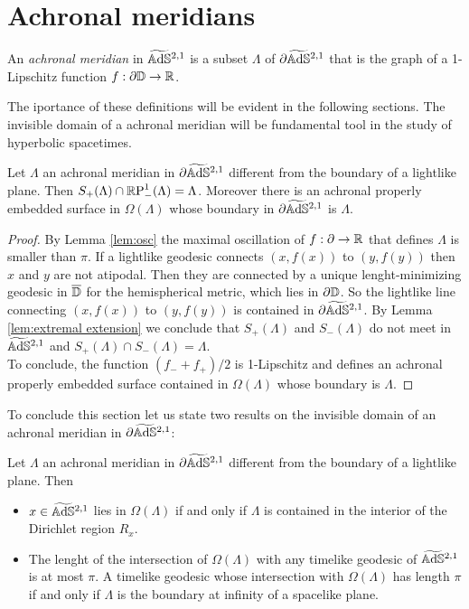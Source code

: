 \section{Achronal meridians}
\begin{definition}
    An \textit{achronal meridian} in $\AS^{2,1}$ is a subset $\Lambda$ of $\partial\AS^{2,1}$ that is the graph of a 1-Lipschitz function $f: \partial\D\to\R$.
\end{definition}
The iportance of these definitions will be evident in the following sections.
The invisible domain of a achronal meridian will be fundamental tool in the study of hyperbolic spacetimes.
\begin{lemma}
    Let $\Lambda$ an achronal meridian in $\partial\AS^{2,1}$ different from the boundary of a lightlike plane. Then $S_+(\Lambda) \cap \S_-(\Lambda)=\Lambda$. Moreover there is an achronal properly embedded surface in $\Omega(\Lambda)$ whose boundary in $\partial\AS^{2,1}$ is $\Lambda$.
\end{lemma}
\begin{proof}
    By Lemma \ref{lem:osc} the maximal oscillation of $f:\partial \to \R$ that defines $\Lambda$ is smaller than $\pi$. If a lightlike geodesic connects $(x,f(x))$ to $(y,f(y))$ then $x$ and $y$ are not atipodal. Then they are connected by a unique lenght-minimizing geodesic in $\overline{\D}$ for the hemispherical metric, which lies in $\partial\D$. So the lightlike line connecting $(x,f(x))$ to $(y,f(y))$ is contained in $\partial\AS^{2,1}$. By Lemma \ref{lem:extremal extension} we conclude that $S_+(\Lambda)$ and $S_-(\Lambda)$ do not meet in $\AS^{2,1}$ and $S_+(\Lambda)\cap S_-(\Lambda)=\Lambda$.\\
    To conclude, the function $(f_- + f_+) /2$ is 1-Lipschitz and defines an achronal properly embedded surface contained in $\Omega(\Lambda)$ whose boundary is $\Lambda$.
\end{proof}
To conclude this section let us state two results on the invisible domain of an achronal meridian in $\partial\AS^{2,1}$:
\begin{proposition}\label{prop:invisible1}
    Let $\Lambda$ an achronal meridian in $\partial\AS^{2,1}$ different from the boundary of a lightlike plane. Then
    \begin{itemize}
        \item $x \in \AS^{2,1}$ lies in $\Omega(\Lambda)$ if and only if $\Lambda$ is contained in the interior of the Dirichlet region $R_x$.
        \item The lenght of the intersection of $\Omega(\Lambda)$ with any timelike geodesic of $\AS^{2,1}$ is at most $\pi$. A timelike geodesic whose intersection with $\Omega(\Lambda)$ has length $\pi$ if and only if $\Lambda$ is the boundary at infinity of a spacelike plane.
    \end{itemize}
\end{proposition}
